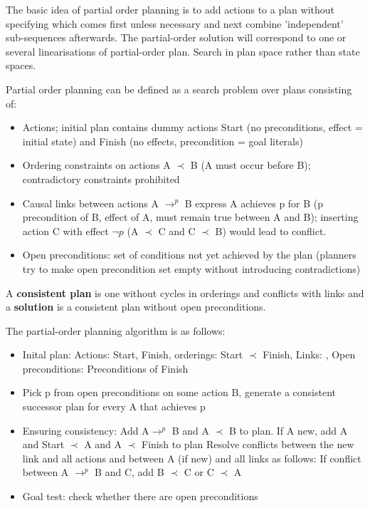 \documentclass{article}
\begin{document}
The basic idea of partial order planning is to add actions to a plan without specifying which comes first unless necessary and next combine 'independent' sub-sequences afterwards. The partial-order solution will correspond to one or several linearisations of partial-order plan. Search in plan space rather than state spaces. 

Partial order planning can be defined as a search problem over plans consisting of:
\begin{itemize}
    \item Actions; initial plan contains dummy actions Start (no preconditions, effect  = initial state) and Finish (no effects, precondition = goal literals)
    \item Ordering constraints on actions A $\prec$ B (A must occur before B); contradictory constraints prohibited 
    \item Causal links between actions A $\rightarrow^p $ B express A achieves p for B (p precondition of B, effect of A, must remain true between A and B); inserting action C with effect $\neg p$ (A $\prec$ C and C $\prec$ B) would lead to conflict.
    \item Open preconditions: set of conditions not yet achieved by the plan (planners try to make open precondition set empty without introducing contradictions)
\end{itemize}

A \textbf{consistent plan} is one without cycles in orderings and conflicts with links and a \textbf{solution} is a consistent plan without open preconditions. 

The partial-order planning algorithm is as follows:
\begin{itemize}
    \item Inital plan: Actions: {Start, Finish}, orderings: {Start $\prec$ Finish},
          Links: {}, Open preconditions: Preconditions of Finish
    \item Pick p from open preconditions on some action B, generate a consistent successor plan for every A that achieves p
    \item Ensuring consistency:
            Add A$\rightarrow^p$ B and A $\prec$ B to plan. If A new, add A and Start $\prec$ A and A $\prec$ Finish to plan
            Resolve conflicts between the new link and all actions and between A (if new) and all links as follows: If conflict between A $\rightarrow^p$ B and C, add B $\prec$ C or C $\prec$ A
    \item Goal test: check whether there are open preconditions
\end{itemize}
\end{document}
